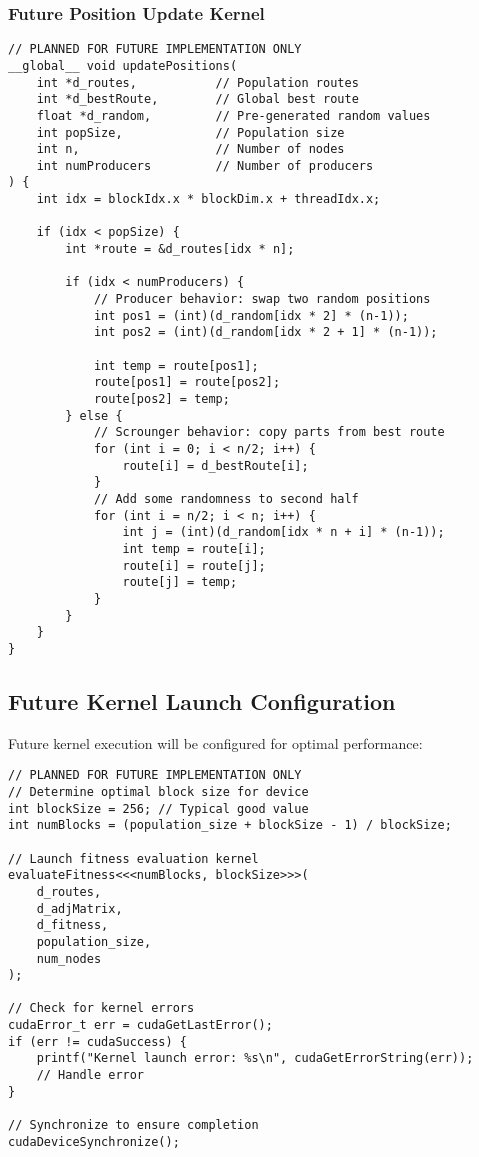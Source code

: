 \documentclass[conference]{IEEEtran}
\begin{document}
\subsubsection{Future Position Update Kernel}
\begin{lstlisting}[caption=Future Parallel Position Update]
// PLANNED FOR FUTURE IMPLEMENTATION ONLY
__global__ void updatePositions(
    int *d_routes,           // Population routes
    int *d_bestRoute,        // Global best route
    float *d_random,         // Pre-generated random values
    int popSize,             // Population size
    int n,                   // Number of nodes
    int numProducers         // Number of producers
) {
    int idx = blockIdx.x * blockDim.x + threadIdx.x;

    if (idx < popSize) {
        int *route = &d_routes[idx * n];

        if (idx < numProducers) {
            // Producer behavior: swap two random positions
            int pos1 = (int)(d_random[idx * 2] * (n-1));
            int pos2 = (int)(d_random[idx * 2 + 1] * (n-1));

            int temp = route[pos1];
            route[pos1] = route[pos2];
            route[pos2] = temp;
        } else {
            // Scrounger behavior: copy parts from best route
            for (int i = 0; i < n/2; i++) {
                route[i] = d_bestRoute[i];
            }
            // Add some randomness to second half
            for (int i = n/2; i < n; i++) {
                int j = (int)(d_random[idx * n + i] * (n-1));
                int temp = route[i];
                route[i] = route[j];
                route[j] = temp;
            }
        }
    }
}
\end{lstlisting}

\subsection{Future Kernel Launch Configuration}
Future kernel execution will be configured for optimal performance:

\begin{lstlisting}[caption=Future Kernel Launch Configuration]
// PLANNED FOR FUTURE IMPLEMENTATION ONLY
// Determine optimal block size for device
int blockSize = 256; // Typical good value
int numBlocks = (population_size + blockSize - 1) / blockSize;

// Launch fitness evaluation kernel
evaluateFitness<<<numBlocks, blockSize>>>(
    d_routes,
    d_adjMatrix,
    d_fitness,
    population_size,
    num_nodes
);

// Check for kernel errors
cudaError_t err = cudaGetLastError();
if (err != cudaSuccess) {
    printf("Kernel launch error: %s\n", cudaGetErrorString(err));
    // Handle error
}

// Synchronize to ensure completion
cudaDeviceSynchronize();
\end{lstlisting}
\end{document}

